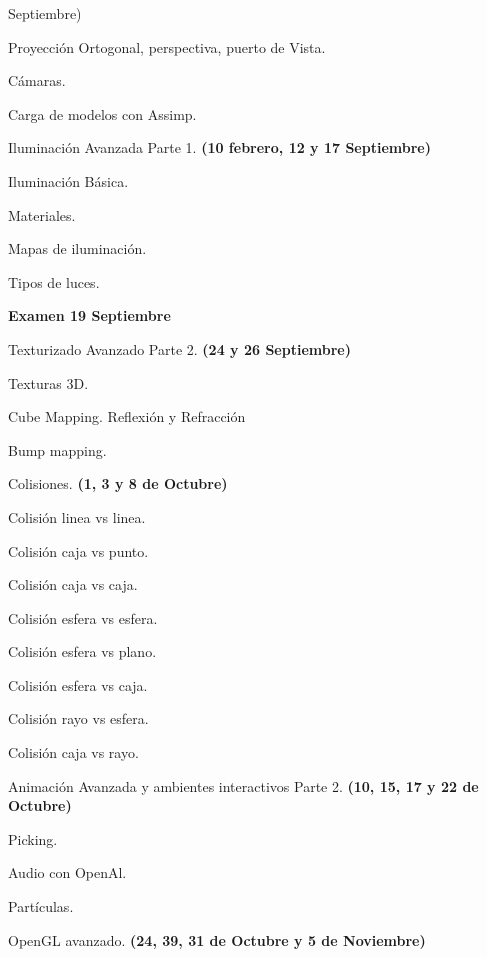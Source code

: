 \documentclass[a4paper,11pt]{article}
\theoremstyle{mytheor}
\begin{document}
\begin{legal}
{Septiembre)}
	\begin{legal}
		\item Proyección Ortogonal, perspectiva, puerto de Vista.
		\item Cámaras.
		\item Carga de modelos con Assimp.
	\end{legal}
	\item Iluminación Avanzada Parte 1. \textbf{(10 febrero, 12 y 17 Septiembre)}
	\begin{legal}
		\item Iluminación Básica.
		\item Materiales.
		\item Mapas de iluminación.
		\item Tipos de luces.
	\end{legal}
		\textbf{Examen 19 Septiembre}
	\item Texturizado Avanzado Parte 2. \textbf{(24 y 26 Septiembre)}
	\begin{legal}
		\item Texturas 3D.
		\item Cube Mapping. Reflexión y Refracción
		\item Bump mapping.
	\end{legal}
	\item Colisiones. \textbf{(1, 3 y 8 de Octubre)}
	\begin{legal}
		\item Colisión linea vs linea.
		\item Colisión caja vs punto.
		\item Colisión caja vs caja.
		\item Colisión esfera vs esfera.
		\item Colisión esfera vs plano.
		\item Colisión esfera vs caja.
		\item Colisión rayo vs esfera.
		\item Colisión caja vs rayo.
	\end{legal}
	\item Animación Avanzada y ambientes interactivos Parte 2. \textbf{(10, 15, 17 y 22 de Octubre)}
	\begin{legal}
		\item Picking.
		\item Audio con OpenAl.
		\item Partículas.
		\item 
	\end{legal}
	\item OpenGL avanzado. \textbf{(24, 39, 31 de Octubre y 5 de Noviembre)}

\end{legal}
\end{document}
